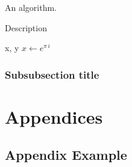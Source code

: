 \documentclass[a4paper]{article}
\begin{document}
An algorithm.
\begin{algorithm}[H]
\caption{Description}
\begin{algorithmic}[1]
 {x, y} 
\State $x\leftarrow e^{\pi\, i}$
\State
{}
\State
\EndIf
\EndProcedure
\end{algorithmic}
\end{algorithm}


\subsubsection{Subsubsection title}


\newpage
\printbibliography



\newpage
\appendix

\section{Appendices}

\newpage
\subsection{Appendix Example}


\end{document}

